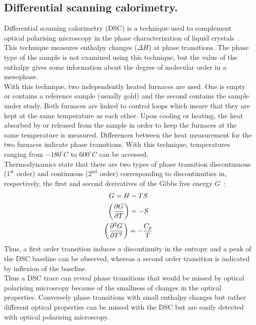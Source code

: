 \subsection{Differential scanning calorimetry.}

Differential scanning calorimetry (DSC) is a technique used to complement optical 
polarising microscopy in the phase characterization of liquid crystals~\cite{Intro_LC}. 
This technique measures
enthalpy changes ($\Delta H$) at phase transitions. The phase type of the sample is not 
examined using this technique, but the value of the enthalpy gives some information about the degree 
of molecular order in a mesophase.\\
With this technique, two independently heated furnaces are used. One is empty or contains a 
reference sample (usually gold) and  the second contains the sample under study. Both furnaces 
are linked to control loops which
insure that they are kept at the same temperature as each other. Upon cooling or heating, the heat 
absorbed by or released from the sample in order to keep the furnaces at the same temperature is 
measured. Differences between the heat measurement for the two furnaces indicate phase transitions. 
With this technique, temperatures  ranging from $-180^\circ C$ to $600^\circ C$ can be accessed.\\

Thermodynamics state that there are two types of phase transition discontinuous ($1^\mathrm{st}$ order)
and continuous ($2^\mathrm{nd}$ order) corresponding to discontinuities in, respectively, the first and
second derivatives of the Gibbs free energy $G$~:
%
\begin{gather}
	G = H - TS\\
	\left(\frac{\partial G}{\partial T}\right) = -S	\\
	\left(\frac{\partial^2 G}{\partial T^2}\right) = -\frac{C_p}{T}
\end{gather}
%
Thus, a first order transition induces a discontinuity in the entropy and a peak of the DSC baseline
can be observed, whereas a second order transition is indicated by  inflexion of the baseline.\\
Thus a DSC trace can reveal phase transitions that would be missed by optical 
polarising microscopy because of the smallness of changes in the optical properties. Conversely phase
transitions with small enthalpy changes but rather different optical properties can be missed
with the DSC but are easily detected with optical polarising microscopy.



